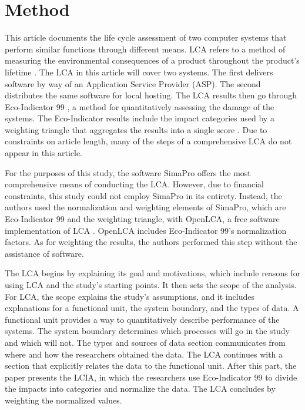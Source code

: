 \documentclass[final,journal,10pt,letterpaper,oneside,twocolumn,compsoc]%
{IEEEtran}
\begin{document}
\section{Method}
This article documents the life cycle assessment of two computer systems
that perform similar functions through different means. LCA refers to a method
of measuring the environmental consequences of a product throughout the
product's
lifetime \cite{14040} \cite{14044}. The LCA in this article will cover two
systems. The first
delivers software by way of an Application Service Provider (ASP). The
second distributes the same software for local hosting. The LCA results then go
through Eco-Indicator 99 \cite{pre}, a method for quantitatively assessing the
damage of the systems. The Eco-Indicator
results include the impact categories used by a weighting triangle that
aggregates the results into a single score \cite{triangle}. Due to constraints
on article length, many of the steps of a comprehensive LCA do not appear in
this article.

For the purposes of this study, the software SimaPro offers the most
comprehensive means of conducting the LCA.
However, due to financial constraints, this study could not employ SimaPro in
its entirety. Instead,
the authors used the normalization and weighting elements of SimaPro, which are
Eco-Indicator 99
and the weighting triangle, with OpenLCA, a free software implementation of LCA
\cite{openlca}. OpenLCA includes Eco-Indicator 99's normalization factors. As
for weighting the results, the
authors performed this step without the assistance of software.

The LCA begins by explaining its goal and motivations, which include reasons for
using LCA and the study's starting points. It then sets the scope of
the analysis. For LCA, the scope explains the study's assumptions, and it
includes explanations for a functional unit,
the system boundary, and the types of data. A functional unit provides a way to
quantitatively describe performance of the systems. The system boundary
determines which processes will go in the study and which will not. The types
and sources of data section communicates from where and how the researchers
obtained the data. The LCA continues with a section that explicitly relates the
data to the functional unit. After this part, the paper presents the LCIA, in
which the researchers use Eco-Indicator 99 to divide the impacts into categories
and normalize the data. The LCA concludes by weighting the normalized values.
\end{document}
